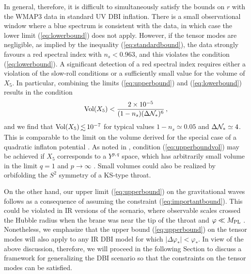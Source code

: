 In general, therefore, it is difficult to simultaneously satisfy 
the bounds on $r$ with the WMAP3 data
in standard UV DBI inflation. There is a 
small observational window where a blue spectrum is consistent 
with the data, in which case the lower limit 
(\ref{eq:lowerbound}) does not apply. 
However, if the tensor modes are negligible,
as implied by the inequality (\ref{eq:standardbound}), the 
data strongly favours a red spectral index with $n_s < 0.963$,
and this violates the condition (\ref{eq:lowerbound}). A significant 
detection of a red spectral index requires either a 
violation of the slow-roll conditions or a sufficiently 
small value for the volume of $X_5$. 
In particular, combining the limits
(\ref{eq:upperbound}) and (\ref{eq:lowerbound}) results in the condition 
% 
\begin{equation}
\label{eq:upperboundvol}
\mathrm{Vol}(X_5) < \frac{2 \times 10^{-5}}{(1-n_s) 
(\Delta {\cal{N}}_{*} )^6}  \,,
\end{equation}
% 
and we find that $\mathrm{Vol}(X_5) \, \lsim \, 10^{-7}$ 
for typical values $1-n_s \simeq 0.05$ and 
$\Delta {\cal{N}}_* \simeq 4$. 
This 
is comparable to the limit on the volume derived for the special case of a 
quadratic inflaton potential \cite{bmpaper}.  
As noted in \cite{bmpaper,bean}, condition 
(\ref{eq:upperboundvol}) may be achieved 
if $X_5$ corresponds to a $Y^{p,q}$ space, 
which has arbitrarily small volume in the limit  
$q =1$ and $p \rightarrow \infty$ \cite{gauntlett}. 
Small volumes could also be realized 
by orbifolding the $S^2$ symmetry of a KS-type throat. 


On the other hand, 
our upper limit (\ref{eq:upperbound}) on the gravitational waves 
follows as a consequence of assuming 
the constraint (\ref{eq:importantbound}). This  
could be violated in IR versions of the scenario, where
observable scales crossed the Hubble radius when the 
brane was near the tip of the throat and $\varphi \ll M_{\mathrm{PL}}$
\cite{brane12,brane14}. 
Nonetheless, we emphasize that the upper bound (\ref{eq:upperbound})
on the tensor modes 
will also apply to any IR DBI model for which 
$|\Delta \varphi_* | < \varphi_*$.  
In view of the above discussion, therefore, 
we will proceed in the following Section
to discuss a framework for generalizing the DBI scenario so 
that the constraints on the tensor modes can be satisfied. 
% 
% 
% 
% 
